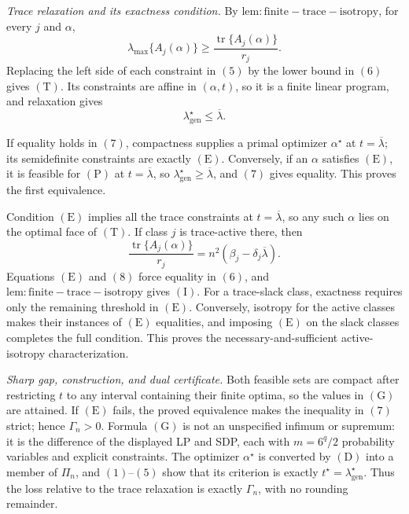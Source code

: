 \textit{Trace relaxation and its exactness condition.}
By \(\mathrm{lem:finite-trace-isotropy}\), for every \(j\) and \(\alpha\),
\[
\lambda_{\max}\{A_j(\alpha)\}
\ge\frac{\operatorname{tr}\{A_j(\alpha)\}}{r_j}.
\tag{6}
\]
Replacing the left side of each constraint in \((5)\) by the lower bound in \((6)\) gives \((\mathrm T)\). Its constraints are affine in \((\alpha,t)\), so it is a finite linear program, and relaxation gives
\[
\lambda_{\mathrm{gen}}^\star\le\overline\lambda.
\tag{7}
\]

If equality holds in \((7)\), compactness supplies a primal optimizer \(\alpha^\star\) at \(t=\overline\lambda\); its semidefinite constraints are exactly \((\mathrm E)\). Conversely, if an \(\alpha\) satisfies \((\mathrm E)\), it is feasible for \((\mathrm P)\) at \(t=\overline\lambda\), so \(\lambda_{\mathrm{gen}}^\star\ge\overline\lambda\), and \((7)\) gives equality. This proves the first equivalence.

Condition \((\mathrm E)\) implies all the trace constraints at \(t=\overline\lambda\), so any such \(\alpha\) lies on the optimal face of \((\mathrm T)\). If class \(j\) is trace-active there, then
\[
\frac{\operatorname{tr}\{A_j(\alpha)\}}{r_j}
=n^2(\beta_j-\delta_j\overline\lambda).
\tag{8}
\]
Equations \((\mathrm E)\) and \((8)\) force equality in \((6)\), and \(\mathrm{lem:finite-trace-isotropy}\) gives \((\mathrm I)\). For a trace-slack class, exactness requires only the remaining threshold in \((\mathrm E)\). Conversely, isotropy for the active classes makes their instances of \((\mathrm E)\) equalities, and imposing \((\mathrm E)\) on the slack classes completes the full condition. This proves the necessary-and-sufficient active-isotropy characterization.

\textit{Sharp gap, construction, and dual certificate.}
Both feasible sets are compact after restricting \(t\) to any interval containing their finite optima, so the values in \((\mathrm G)\) are attained. If \((\mathrm E)\) fails, the proved equivalence makes the inequality in \((7)\) strict; hence \(\Gamma_n>0\). Formula \((\mathrm G)\) is not an unspecified infimum or supremum: it is the difference of the displayed LP and SDP, each with \(m=6^q/2\) probability variables and explicit constraints. The optimizer \(\alpha^\star\) is converted by \((\mathrm D)\) into a member of \(\Pi_n\), and \((1)\)--\((5)\) show that its criterion is exactly \(t^\star=\lambda_{\mathrm{gen}}^\star\). Thus the loss relative to the trace relaxation is exactly \(\Gamma_n\), with no rounding remainder.

